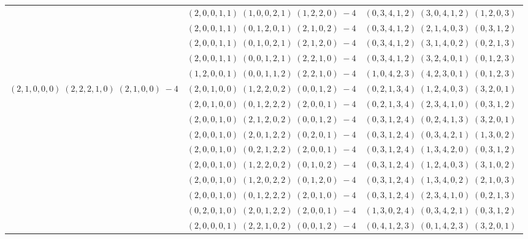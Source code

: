 \documentclass[11pt]{article}
\begin{document}
\begin{longtable}[l]{|c|c|c|}
 \cline{2-3} 
 & $(2 ,0 ,0 ,1 ,1) \;(1 ,0 ,0 ,2 ,1) \;(1 ,2 ,2 ,0) \;-4$ & $(0 ,3 ,4 ,1 ,2) \;(3 ,0 ,4 ,1 ,2) \;(1 ,2 ,0 ,3) \;$\\ 
 \cline{2-3} 
 & $(2 ,0 ,0 ,1 ,1) \;(0 ,1 ,2 ,0 ,1) \;(2 ,1 ,0 ,2) \;-4$ & $(0 ,3 ,4 ,1 ,2) \;(2 ,1 ,4 ,0 ,3) \;(0 ,3 ,1 ,2) \;$\\ 
 \cline{2-3} 
 & $(2 ,0 ,0 ,1 ,1) \;(0 ,1 ,0 ,2 ,1) \;(2 ,1 ,2 ,0) \;-4$ & $(0 ,3 ,4 ,1 ,2) \;(3 ,1 ,4 ,0 ,2) \;(0 ,2 ,1 ,3) \;$\\ 
 \cline{2-3} 
 & $(2 ,0 ,0 ,1 ,1) \;(0 ,0 ,1 ,2 ,1) \;(2 ,2 ,1 ,0) \;-4$ & $(0 ,3 ,4 ,1 ,2) \;(3 ,2 ,4 ,0 ,1) \;(0 ,1 ,2 ,3) \;$\\ 
 \cline{2-3} 
 & $(1 ,2 ,0 ,0 ,1) \;(0 ,0 ,1 ,1 ,2) \;(2 ,2 ,1 ,0) \;-4$ & $(1 ,0 ,4 ,2 ,3) \;(4 ,2 ,3 ,0 ,1) \;(0 ,1 ,2 ,3) \;$\\ \hline\multirow[t]{34}{*}{ $(2 ,1 ,0 ,0 ,0) \;(2 ,2 ,2 ,1 ,0) \;(2 ,1 ,0 ,0) \;-4$ }  & $(2 ,0 ,1 ,0 ,0) \;(1 ,2 ,2 ,0 ,2) \;(0 ,0 ,1 ,2) \;-4$ & $(0 ,2 ,1 ,3 ,4) \;(1 ,2 ,4 ,0 ,3) \;(3 ,2 ,0 ,1) \;$\\ 
 \cline{2-3} 
 & $(2 ,0 ,1 ,0 ,0) \;(0 ,1 ,2 ,2 ,2) \;(2 ,0 ,0 ,1) \;-4$ & $(0 ,2 ,1 ,3 ,4) \;(2 ,3 ,4 ,1 ,0) \;(0 ,3 ,1 ,2) \;$\\ 
 \cline{2-3} 
 & $(2 ,0 ,0 ,1 ,0) \;(2 ,1 ,2 ,0 ,2) \;(0 ,0 ,1 ,2) \;-4$ & $(0 ,3 ,1 ,2 ,4) \;(0 ,2 ,4 ,1 ,3) \;(3 ,2 ,0 ,1) \;$\\ 
 \cline{2-3} 
 & $(2 ,0 ,0 ,1 ,0) \;(2 ,0 ,1 ,2 ,2) \;(0 ,2 ,0 ,1) \;-4$ & $(0 ,3 ,1 ,2 ,4) \;(0 ,3 ,4 ,2 ,1) \;(1 ,3 ,0 ,2) \;$\\ 
 \cline{2-3} 
 & $(2 ,0 ,0 ,1 ,0) \;(0 ,2 ,1 ,2 ,2) \;(2 ,0 ,0 ,1) \;-4$ & $(0 ,3 ,1 ,2 ,4) \;(1 ,3 ,4 ,2 ,0) \;(0 ,3 ,1 ,2) \;$\\ 
 \cline{2-3} 
 & $(2 ,0 ,0 ,1 ,0) \;(1 ,2 ,2 ,0 ,2) \;(0 ,1 ,0 ,2) \;-4$ & $(0 ,3 ,1 ,2 ,4) \;(1 ,2 ,4 ,0 ,3) \;(3 ,1 ,0 ,2) \;$\\ 
 \cline{2-3} 
 & $(2 ,0 ,0 ,1 ,0) \;(1 ,2 ,0 ,2 ,2) \;(0 ,1 ,2 ,0) \;-4$ & $(0 ,3 ,1 ,2 ,4) \;(1 ,3 ,4 ,0 ,2) \;(2 ,1 ,0 ,3) \;$\\ 
 \cline{2-3} 
 & $(2 ,0 ,0 ,1 ,0) \;(0 ,1 ,2 ,2 ,2) \;(2 ,0 ,1 ,0) \;-4$ & $(0 ,3 ,1 ,2 ,4) \;(2 ,3 ,4 ,1 ,0) \;(0 ,2 ,1 ,3) \;$\\ 
 \cline{2-3} 
 & $(0 ,2 ,0 ,1 ,0) \;(2 ,0 ,1 ,2 ,2) \;(2 ,0 ,0 ,1) \;-4$ & $(1 ,3 ,0 ,2 ,4) \;(0 ,3 ,4 ,2 ,1) \;(0 ,3 ,1 ,2) \;$\\ 
 \cline{2-3} 
 & $(2 ,0 ,0 ,0 ,1) \;(2 ,2 ,1 ,0 ,2) \;(0 ,0 ,1 ,2) \;-4$ & $(0 ,4 ,1 ,2 ,3) \;(0 ,1 ,4 ,2 ,3) \;(3 ,2 ,0 ,1) \;$\\ 

\end{longtable}
\end{document}
